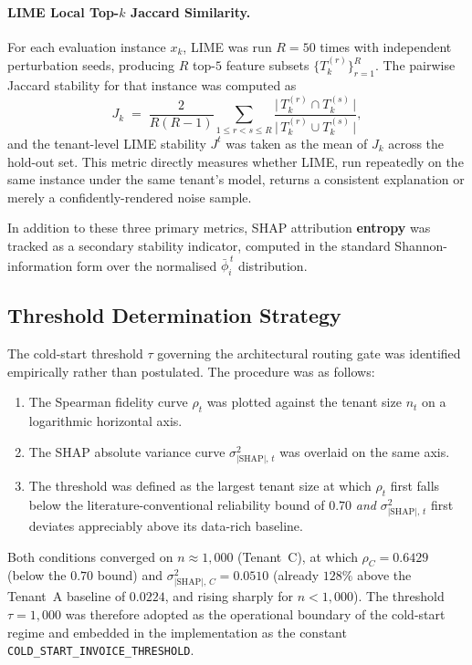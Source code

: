 \paragraph{LIME Local Top-$k$ Jaccard Similarity.}
For each evaluation instance $x_k$, LIME was run $R = 50$ times with
independent perturbation seeds, producing $R$ top-$5$ feature subsets
$\{T^{(r)}_k\}_{r=1}^{R}$. The pairwise Jaccard stability for that instance
was computed as
\begin{equation}
J_k \;=\;
\frac{2}{R(R-1)} \sum_{1 \le r < s \le R}
\frac{\bigl|\,T^{(r)}_k \cap T^{(s)}_k\,\bigr|}
     {\bigl|\,T^{(r)}_k \cup T^{(s)}_k\,\bigr|},
\label{eq:lime-jaccard}
\end{equation}
and the tenant-level LIME stability $J^{t}$ was taken as the mean of $J_k$
across the hold-out set. This metric directly measures whether LIME, run
repeatedly on the same instance under the same tenant's model, returns a
consistent explanation or merely a confidently-rendered noise sample.

In addition to these three primary metrics, SHAP attribution
\textbf{entropy} was tracked as a secondary stability indicator, computed
in the standard Shannon-information form over the normalised
$\bar{\phi}_i^{\,t}$ distribution.

\subsection{Threshold Determination Strategy}
\label{subsec:threshold}

The cold-start threshold $\tau$ governing the architectural routing gate
was identified empirically rather than postulated. The procedure was as
follows:

\begin{enumerate}
    \item The Spearman fidelity curve $\rho_t$ was plotted against the
    tenant size $n_t$ on a logarithmic horizontal axis.
    \item The SHAP absolute variance curve $\sigma^2_{|\text{SHAP}|,\,t}$
    was overlaid on the same axis.
    \item The threshold was defined as the largest tenant size at which
    $\rho_t$ first falls below the literature-conventional reliability
    bound of $0.70$ \emph{and} $\sigma^2_{|\text{SHAP}|,\,t}$ first
    deviates appreciably above its data-rich baseline.
\end{enumerate}

Both conditions converged on $n \approx 1{,}000$ (Tenant~C), at which
$\rho_C = 0.6429$ (below the $0.70$ bound) and
$\sigma^2_{|\text{SHAP}|,\,C} = 0.0510$ (already $128\%$ above the Tenant~A
baseline of $0.0224$, and rising sharply for $n < 1{,}000$). The threshold
$\tau = 1{,}000$ was therefore adopted as the operational boundary of the
cold-start regime and embedded in the implementation as the constant
\texttt{COLD\_START\_INVOICE\_THRESHOLD}.

